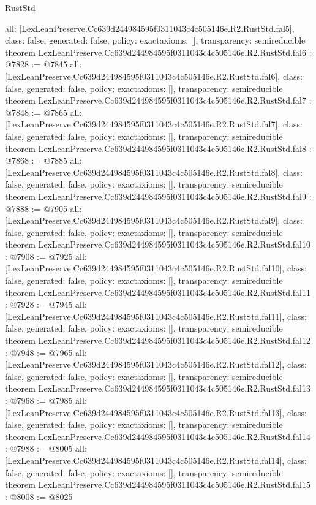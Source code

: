 \begin{lexlean}{RustStd}
\begin{coremodule}
{  all: [LexLeanPreserve.Cc639d244984595f0311043c4c505146e.R2.RustStd.fal5],
  class: false,
  generated: false,
  policy: exact{axioms: []},
  transparency: semireducible
}
theorem LexLeanPreserve.Cc639d244984595f0311043c4c505146e.R2.RustStd.fal6 : @7828 := @7845 {
  all: [LexLeanPreserve.Cc639d244984595f0311043c4c505146e.R2.RustStd.fal6],
  class: false,
  generated: false,
  policy: exact{axioms: []},
  transparency: semireducible
}
theorem LexLeanPreserve.Cc639d244984595f0311043c4c505146e.R2.RustStd.fal7 : @7848 := @7865 {
  all: [LexLeanPreserve.Cc639d244984595f0311043c4c505146e.R2.RustStd.fal7],
  class: false,
  generated: false,
  policy: exact{axioms: []},
  transparency: semireducible
}
theorem LexLeanPreserve.Cc639d244984595f0311043c4c505146e.R2.RustStd.fal8 : @7868 := @7885 {
  all: [LexLeanPreserve.Cc639d244984595f0311043c4c505146e.R2.RustStd.fal8],
  class: false,
  generated: false,
  policy: exact{axioms: []},
  transparency: semireducible
}
theorem LexLeanPreserve.Cc639d244984595f0311043c4c505146e.R2.RustStd.fal9 : @7888 := @7905 {
  all: [LexLeanPreserve.Cc639d244984595f0311043c4c505146e.R2.RustStd.fal9],
  class: false,
  generated: false,
  policy: exact{axioms: []},
  transparency: semireducible
}
theorem LexLeanPreserve.Cc639d244984595f0311043c4c505146e.R2.RustStd.fal10 : @7908 := @7925 {
  all: [LexLeanPreserve.Cc639d244984595f0311043c4c505146e.R2.RustStd.fal10],
  class: false,
  generated: false,
  policy: exact{axioms: []},
  transparency: semireducible
}
theorem LexLeanPreserve.Cc639d244984595f0311043c4c505146e.R2.RustStd.fal11 : @7928 := @7945 {
  all: [LexLeanPreserve.Cc639d244984595f0311043c4c505146e.R2.RustStd.fal11],
  class: false,
  generated: false,
  policy: exact{axioms: []},
  transparency: semireducible
}
theorem LexLeanPreserve.Cc639d244984595f0311043c4c505146e.R2.RustStd.fal12 : @7948 := @7965 {
  all: [LexLeanPreserve.Cc639d244984595f0311043c4c505146e.R2.RustStd.fal12],
  class: false,
  generated: false,
  policy: exact{axioms: []},
  transparency: semireducible
}
theorem LexLeanPreserve.Cc639d244984595f0311043c4c505146e.R2.RustStd.fal13 : @7968 := @7985 {
  all: [LexLeanPreserve.Cc639d244984595f0311043c4c505146e.R2.RustStd.fal13],
  class: false,
  generated: false,
  policy: exact{axioms: []},
  transparency: semireducible
}
theorem LexLeanPreserve.Cc639d244984595f0311043c4c505146e.R2.RustStd.fal14 : @7988 := @8005 {
  all: [LexLeanPreserve.Cc639d244984595f0311043c4c505146e.R2.RustStd.fal14],
  class: false,
  generated: false,
  policy: exact{axioms: []},
  transparency: semireducible
}
theorem LexLeanPreserve.Cc639d244984595f0311043c4c505146e.R2.RustStd.fal15 : @8008 := @8025 {
}
\end{coremodule}
\end{lexlean}
